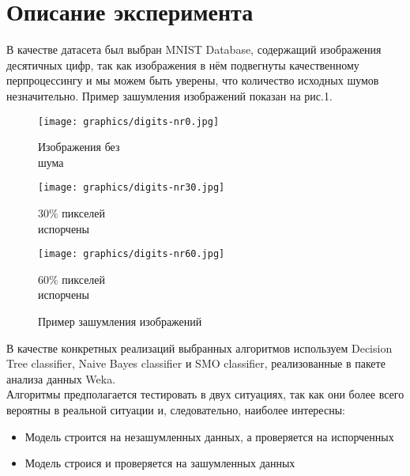 \documentclass{article}
\begin{document}
\section{Описание эксперимента}
В качестве датасета был выбран MNIST Database, содержащий изображения десятичных цифр, так как изображения в нём подвегнуты качественному перпроцессингу и мы можем быть уверены, что количество исходных шумов незначительно. Пример зашумления изображений показан на рис.1.

\begin{figure}[ht]
\centering
\begin{minipage}{.3\textwidth}
	\texttt{[image: graphics/digits-nr0.jpg]}
	\captionsetup{justification=centering}
	\caption*{Изображения без\\ шума}
\end{minipage}
\begin{minipage}{.3\textwidth}
	\texttt{[image: graphics/digits-nr30.jpg]}
	\captionsetup{justification=centering}
	\caption*{ 30\% пикселей\\ испорчены}
\end{minipage}
\begin{minipage}{.3\textwidth}
	\texttt{[image: graphics/digits-nr60.jpg]}
	\captionsetup{justification=centering}
	\caption*{ 60\% пикселей\\ испорчены}
\end{minipage}
\caption{Пример зашумления изображений}
\end{figure}

В качестве конкретных реализаций выбранных алгоритмов используем Decision Tree classifier, Naive Bayes classifier и SMO classifier, реализованные в пакете анализа данных Weka.
\\Алгоритмы предполагается тестировать в двух ситуациях, так как они более всего вероятны в реальной ситуации и, следовательно, наиболее интересны:
\begin{itemize}
\item Модель строится на незашумленных данных, а проверяется на испорченных
\item Модель строися и проверяется на зашумленных данных
\end{itemize}
\end{document}
